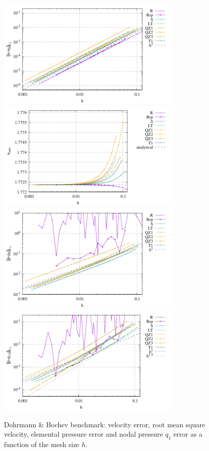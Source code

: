 \documentclass[a4paper,12pt]{article}
\begin{document}
\begin{figure}
\centering
\includegraphics[width=8.9cm]{../results/errors_u_exp9}
\includegraphics[width=8.9cm]{../results/vrms_exp9} \\
\includegraphics[width=8.9cm]{../results/errors_p_exp9}
\includegraphics[width=8.9cm]{../results/errors_q1_exp9}
\caption{Dohrmann \& Bochev benchmark: velocity error, 
root mean square velocity, elemental pressure error and nodal pressure $q_1$ error
as a function of the mesh size $h$.} 
\label{fig:resexp9}
\end{figure}
\end{document}
